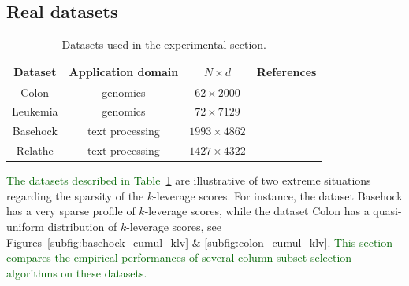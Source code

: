 \documentclass[twoside,11pt]{book}
\newcommand{\rev}[1]{\textcolor{darkgreen}{#1}}
\numberwithin{theorem}{chapter}
\numberwithin{definition}{chapter}
\numberwithin{proposition}{chapter}
\numberwithin{corollary}{chapter}
\numberwithin{example}{chapter}
\numberwithin{lemma}{chapter}
\begin{document}


\subsection{Real datasets}
\label{s:realDatasets}

\begin{table}[h]
\centering
 \begin{tabular}{| c| c | c| c|}
 \hline
  Dataset & Application domain & $N \times d$  &  References\\
 \hline
 Colon & genomics & $62 \times 2000$  & \citep{Al99}\\
 \hline
 Leukemia & genomics &$72 \times 7129$ & \citep{Go99}\\
 \hline
 Basehock & text processing &$1993 \times 4862$ & \citep{Li17} \\
 \hline
 Relathe & text processing & $1427 \times 4322$ & \citep{Li17}\\
 \hline
\end{tabular}
\caption{Datasets used in the experimental section.
\label{table:real_datasets}}
\end{table}

\rev{The datasets described in Table~\ref{table:real_datasets}} are illustrative of two extreme situations regarding the sparsity of the $k$-leverage scores. For instance, the dataset Basehock has a very sparse profile of $k$-leverage scores, while the dataset Colon has a quasi-uniform distribution of $k$-leverage scores, see Figures~\ref{subfig:basehock_cumul_klv}  \& \ref{subfig:colon_cumul_klv}. \rev{This section compares the empirical performances of several column subset selection algorithms on these datasets.}
\end{document}

